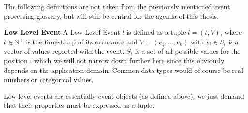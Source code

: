 The following definitions are not taken from the previously mentioned event processing glossary, but will still be central for the agenda of this thesis.

\begin{mydef}
\textbf{Low Level Event} A Low Level Event $l$ is defined as a tuple $l= (t,V)$, where $t \in \mathbb{N}^+$ is the timestamp of its occurance and $V=(v_1,...,v_k)$ with $v_i \in S_i$ is a vector of values reported with the event. $S_i$ is a set of all possible values for the position $i$ which we will not narrow down further here since this obviously depends on the application domain. Common data types would of course be real numbers or categorical values.
\end{mydef}

Low level events are essentially event objects (as defined above), we just demand that their properties must be expressed as a tuple.

